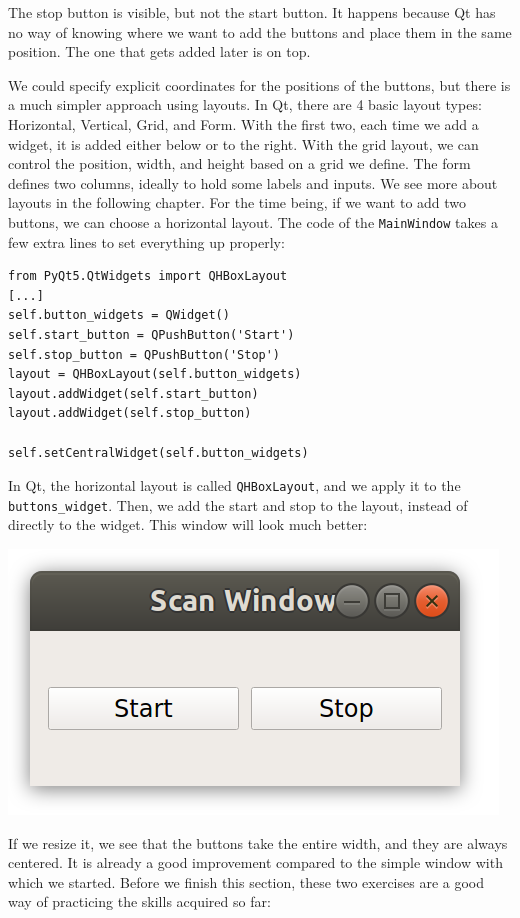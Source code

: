 The stop button is visible, but not the start button. It happens because Qt has no way of knowing where we want to add the buttons and place them in the same position. The one that gets added later is on top.


We could specify explicit coordinates for the positions of the buttons, but there is a much simpler approach using layouts. In Qt, there are 4 basic layout types: Horizontal, Vertical, Grid, and Form. With the first two, each time we add a widget, it is added either below or to the right. With the grid layout, we can control the position, width, and height based on a grid we define. The form defines two columns, ideally to hold some labels and inputs. We see more about layouts in the following chapter. For the time being, if we want to add two buttons, we can choose a horizontal layout. The code of the \texttt{MainWindow} takes a few extra lines to set everything up properly:

\begin{verbatim}
from PyQt5.QtWidgets import QHBoxLayout
[...]
self.button_widgets = QWidget()
self.start_button = QPushButton('Start')
self.stop_button = QPushButton('Stop')
layout = QHBoxLayout(self.button_widgets)
layout.addWidget(self.start_button)
layout.addWidget(self.stop_button)

self.setCentralWidget(self.button_widgets)
\end{verbatim}

In Qt, the horizontal layout is called \texttt{QHBoxLayout}, and we apply it to the \texttt{buttons\_widget}. Then, we add the start and stop to the layout, instead of directly to the widget. This window will look much better:

\begin{center}
    \includegraphics[width=.3\textwidth]{images/Chapter_08/06_window_with_layout.png}
\end{center}

If we resize it, we see that the buttons take the entire width, and they are always centered. It is already a good improvement compared to the simple window with which we started. Before we finish this section, these two exercises are a good way of practicing the skills acquired so far:

